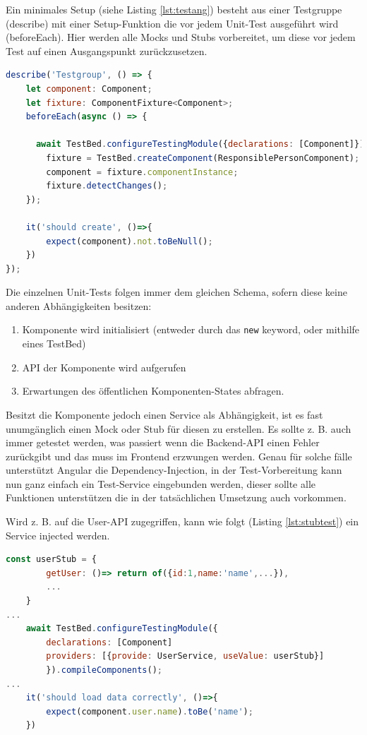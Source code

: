 Ein minimales Setup (siehe Listing \ref{lst:testang}) besteht aus einer Testgruppe (describe) mit einer Setup-Funktion die vor jedem Unit-Test ausgeführt wird (beforeEach). Hier werden alle Mocks und Stubs vorbereitet, um diese vor jedem Test auf einen Ausgangspunkt zurückzusetzen. 

\begin{lstlisting}[language=JavaScript,caption={Minimaler Test einer Komponente},label=lst:testang]
describe('Testgroup', () => {
    let component: Component;
    let fixture: ComponentFixture<Component>;
    beforeEach(async () => {
    
      await TestBed.configureTestingModule({declarations: [Component]}).compileComponents();
        fixture = TestBed.createComponent(ResponsiblePersonComponent);
        component = fixture.componentInstance;
        fixture.detectChanges();
    });

    it('should create', ()=>{
        expect(component).not.toBeNull();
    })
});
\end{lstlisting}

Die einzelnen Unit-Tests folgen immer dem gleichen Schema, sofern diese keine anderen Abhängigkeiten besitzen:
\begin{enumerate}
    \item Komponente wird initialisiert (entweder durch das \lstinline|new| keyword, oder mithilfe eines TestBed)
    \item API der Komponente wird aufgerufen
    \item Erwartungen des öffentlichen Komponenten-States abfragen.
\end{enumerate}

Besitzt die Komponente jedoch einen Service als Abhängigkeit, ist es fast unumgänglich einen Mock oder Stub für diesen zu erstellen. Es sollte z. B. auch immer getestet werden, was passiert wenn die Backend-API einen Fehler zurückgibt und das muss im Frontend erzwungen werden. Genau für solche fälle unterstützt Angular die Dependency-Injection, in der Test-Vorbereitung kann nun ganz einfach ein Test-Service eingebunden werden, dieser sollte alle Funktionen unterstützen die in der tatsächlichen Umsetzung auch vorkommen. 

Wird z. B. auf die User-API zugegriffen, kann wie folgt (Listing \ref{lst:stubtest}) ein Service injected werden.

\begin{lstlisting}[language=JavaScript,caption={Injection eines Service-Stubs},label=lst:stubtest]
    const userStub = {
        getUser: ()=> return of({id:1,name:'name',...}),
        ...
    }
...
    await TestBed.configureTestingModule({
        declarations: [Component]
        providers: [{provide: UserService, useValue: userStub}]
        }).compileComponents();
...
    it('should load data correctly', ()=>{
        expect(component.user.name).toBe('name');
    })
\end{lstlisting}

